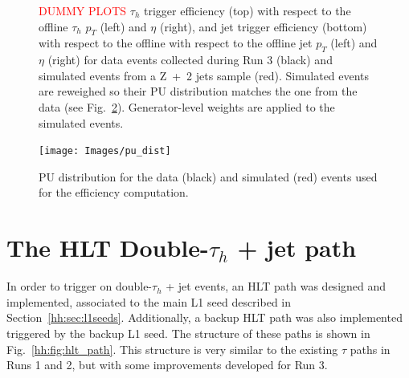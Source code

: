 \documentclass[../main.tex]{subfiles}
\begin{document}
\begin{figure}[h!]
\begin{center}
\end{center}
\caption{\textcolor{red}{DUMMY PLOTS} $\tau_h$ trigger efficiency (top) with respect to the offline $\tau_h$ $p_T$ (left) and $\eta$ (right), and jet trigger efficiency (bottom) with respect to the offline with respect to the offline jet $p_T$ (left) and $\eta$ (right) for data events collected during Run 3 (black) and simulated events from a Z~+~2 jets sample (red). Simulated events are reweighed so their PU distribution matches the one from the data (see Fig.~\ref{hh:fig:trig_pu_dist}). Generator-level weights are applied to the simulated events. }
\label{hh:fig:l1_eff_datamc}
\end{figure}

\begin{figure}[h!]
\begin{center}
\texttt{[image: Images/pu\_dist]}
\end{center}
\caption{PU distribution for the data (black) and simulated (red) events used for the efficiency computation.}
\label{hh:fig:trig_pu_dist}
\end{figure}



\section{The HLT Double-$\tau_h$ + jet path}
\label{hh:sec:hlt_doubletaujet}

In order to trigger on double-$\tau_h$ + jet events, an HLT path was designed and implemented, associated to the main L1 seed described in Section~\ref{hh:sec:l1seeds}. Additionally, a backup HLT path was also implemented triggered by the backup L1 seed. The structure of these paths is shown in Fig.~\ref{hh:fig:hlt_path}. This structure is very similar to the existing $\tau$ paths in Runs 1 and 2, but with some improvements developed for Run 3.
\end{document}
